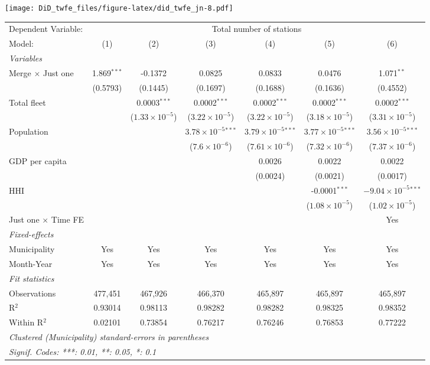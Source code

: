 \documentclass[
]{article}
\begin{document}
\texttt{[image: DiD\_twfe\_files/figure-latex/did\_twfe\_jn-8.pdf]}

\begin{tabular}{lcccccc}
\tabularnewline\midrule\midrule
Dependent Variable:&\multicolumn{6}{c}{Total number of stations}\\
Model:&(1) & (2) & (3) & (4) & (5) & (6)\\
\midrule \emph{Variables}&   &   &   &   &   &  \\
Merge $\times $ Just one & 1.869$^{***}$ & -0.1372 & 0.0825 & 0.0833 & 0.0476 & 1.071$^{**}$\\
  &(0.5793) & (0.1445) & (0.1697) & (0.1688) & (0.1636) & (0.4552)\\
Total fleet &    & 0.0003$^{***}$ & 0.0002$^{***}$ & 0.0002$^{***}$ & 0.0002$^{***}$ & 0.0002$^{***}$\\
  &   & ($1.33\times 10^{-5}$) & ($3.22\times 10^{-5}$) & ($3.22\times 10^{-5}$) & ($3.18\times 10^{-5}$) & ($3.31\times 10^{-5}$)\\
Population &    &    & $3.78\times 10^{-5}$$^{***}$ & $3.79\times 10^{-5}$$^{***}$ & $3.77\times 10^{-5}$$^{***}$ & $3.56\times 10^{-5}$$^{***}$\\
  &   &    & ($7.6\times 10^{-6}$) & ($7.61\times 10^{-6}$) & ($7.32\times 10^{-6}$) & ($7.37\times 10^{-6}$)\\
GDP per capita &    &    &    & 0.0026 & 0.0022 & 0.0022\\
  &   &    &    & (0.0024) & (0.0021) & (0.0017)\\
HHI &    &    &    &    & -0.0001$^{***}$ & $-9.04\times 10^{-5}$$^{***}$\\
  &   &    &    &    & ($1.08\times 10^{-5}$) & ($1.02\times 10^{-5}$)\\
Just one $\times$ Time FE &  &  &  &  &  & Yes\\
\midrule \emph{Fixed-effects}&   &   &   &   &   &  \\
Municipality & Yes & Yes & Yes & Yes & Yes & Yes\\
Month-Year & Yes & Yes & Yes & Yes & Yes & Yes\\
\midrule \emph{Fit statistics}&  & & & & & \\
Observations & 477,451&467,926&466,370&465,897&465,897&465,897\\
R$^2$ & 0.93014&0.98113&0.98282&0.98282&0.98325&0.98352\\
Within R$^2$ & 0.02101&0.73854&0.76217&0.76246&0.76853&0.77222\\
\midrule\midrule\multicolumn{7}{l}{\emph{Clustered (Municipality) standard-errors in parentheses}}\\
\multicolumn{7}{l}{\emph{Signif. Codes: ***: 0.01, **: 0.05, *: 0.1}}\\
\end{tabular}
\end{document}
